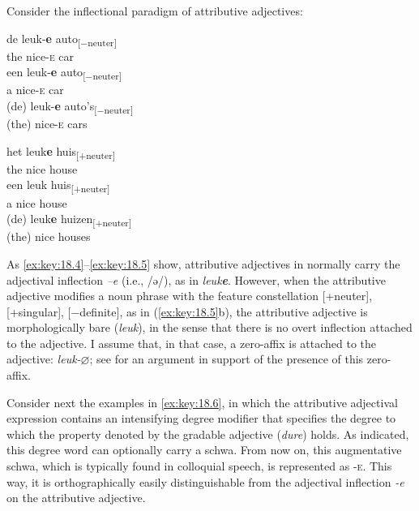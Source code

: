 \documentclass[output=paper]{langsci/langscibook}
\begin{document}
Consider the inflectional paradigm of  attributive adjectives:

\ea%
\label{ex:key:18.4}
	\ea
	\gll de  leuk-\textbf{e}  auto\textsubscript{[−neuter]}\\
		the    nice-\textsc{e}  car  \\
	\ex
	\gll een  leuk-\textbf{e}  auto\textsubscript{[−neuter]}\\
		a        nice-\textsc{e}  car\\
	\ex
	\gll  (de)  leuk-\textbf{e}  auto's\textsubscript{[−neuter]}\\
		(the)  nice-\textsc{e}  cars \\
	\z
\z

\ea%
\label{ex:key:18.5}
	\ea
	\gll het leuk\textbf{e}  huis\textsubscript{[+neuter]}\\
		the    nice    house\\
	\ex
	\gll een leuk  huis\textsubscript{[+neuter]}\\
		a        nice  house\\
	\ex
	\gll  (de)  leuk\textbf{e}  huizen\textsubscript{[+neuter]}\\
		 (the)  nice    houses\\
	\z
\z

As \eqref{ex:key:18.4}--\eqref{ex:key:18.5} show, attributive adjectives in 
normally carry the adjectival inflection \emph{–e} (i.e., /ə/), as in
\emph{leuk}\textbf{\emph{e}}. However, when the attributive adjective modifies
a noun phrase with the feature constellation [+neuter], [+singular],
[−definite], as in (\ref{ex:key:18.5}b), the attributive adjective is
morphologically bare (\emph{leuk}), in the sense that there is no overt
inflection attached to the adjective. I assume that, in that case, a zero-affix
is attached to the adjective: \emph{leuk-$\varnothing$}; see
 for an argument in support of the presence of this
zero-affix.

Consider next the examples in \eqref{ex:key:18.6}, in which the attributive
adjectival expression contains an intensifying degree modifier that specifies
the degree to which the property denoted by the gradable adjective
(\emph{dure}) holds. As indicated, this degree word can optionally carry a
schwa. From now on, this augmentative schwa, which is typically found in
colloquial speech, is represented as \textsc{-e}. This way, it is
orthographically easily distinguishable from the adjectival inflection
\emph{-e} on the attributive adjective.
\end{document}
